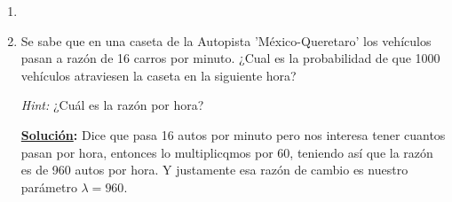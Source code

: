 \documentclass[11pt,letterpaper]{report}
\newcommand{\sol}{\textbf{\underline{Solución}: }} %
\begin{document}
\begin{enumerate}
\begin{itemize}
    \item Prueba el resultado anterior directamente haciendo uso de la expansión en Serie de Taylor de $e^{-\lambda}+e^{\lambda}$.
    
    \begin{proof}
        Usando la expansión de Taylor de una función exponencial se tiene:
        \[
            P(X \text{ es 'Par'}) = P(X = 2k) = \sum_{k=0}^{\infty}\frac{\lambda^{2k}}{(2k)!}e^{-\lambda} =
                e^{-\lambda} \cdot \frac{e^{\lambda} + e^{-\lambda}}{2} = \frac{1 + e^{-2\lambda}}{2}
        \]
        La serie de Taylor de $e^\lambda$ es:
        \[
            e^\lambda = \sum_{k=0}^{\infty} \frac{\lambda^k}{k!} \tag{1}
        \]
        La serie de Taylor de $e^{-\lambda}$ es:
        \[
            e^{-\lambda} = \sum_{k=0}^{\infty} \frac{(-\lambda)^k}{k!} \tag{2}
        \]
        Sumando (1) y (2), se tiene,
        \[
            e^\lambda + e^{-\lambda} =
            \sum_{k=0}^{\infty} \frac{\lambda^k}{k!} + \sum_{k=0}^{\infty} \frac{(-\lambda)^k}{k!} =
            2 \sum_{k=0}^{\infty} \frac{\lambda^{2k}}{(2k)!}
        \]
        Por lo tanto,
        \begin{align*}
            P(X \text{ es 'Par'})
                &= e^{-\lambda}(\sum_{k=0}^{\infty}\frac{\lambda^{2k}}{(2k)!})\\
                &= e^{-\lambda}(\frac{\sum_{k=0}^{\infty}\frac{\lambda^{2k}}{(2k)!}}{2})\\
                &= e^{-\lambda}(\frac{e^\lambda + e^{-\lambda}}{2})\\
                &= \frac{1}{2} (1 + e^{-2\lambda})
        \end{align*}
    \end{proof}
    
\end{itemize}

\item \faFrownO

\item Se sabe que en una caseta de la Autopista 'México-Queretaro' los vehículos pasan a razón de 16 carros por minuto.
¿Cual es la probabilidad de que 1000 vehículos atraviesen la caseta en la siguiente hora?

\textit{Hint:} ¿Cuál es la razón por hora?

\sol Dice que pasa 16 autos por minuto pero nos interesa tener cuantos pasan por hora, entonces lo
multiplicqmos por 60, teniendo así que la razón es de 960 autos por hora. Y justamente esa razón de
cambio es nuestro parámetro $\lambda=960$.


\end{enumerate}
\end{document}
